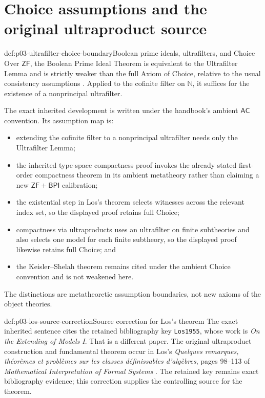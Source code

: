 \section*{Choice assumptions and the original ultraproduct source}

\begin{proofboundary}{def:p03-ultrafilter-choice-boundary}{Boolean prime ideals, ultrafilters, and Choice}
Over \(\mathsf{ZF}\), the Boolean Prime Ideal Theorem is equivalent to the
Ultrafilter Lemma and is strictly weaker than the full Axiom of Choice, relative
to the usual consistency assumptions \cite{HowardRubin1998}.  Applied to the
cofinite filter on \(\mathbb N\), it suffices for the existence of a
nonprincipal ultrafilter.

The exact inherited development is written under the handbook's ambient
\(\mathsf{AC}\) convention.  Its assumption map is:
\begin{itemize}
  \item extending the cofinite filter to a nonprincipal ultrafilter needs only
        the Ultrafilter Lemma;
  \item the inherited type-space compactness proof invokes the already stated
        first-order compactness theorem in its ambient metatheory rather than
        claiming a new \(\mathsf{ZF}+\mathsf{BPI}\) calibration;
  \item the existential step in Los's theorem selects witnesses across the
        relevant index set, so the displayed proof retains full Choice;
  \item compactness via ultraproducts uses an ultrafilter on finite subtheories
        and also selects one model for each finite subtheory, so the displayed
        proof likewise retains full Choice; and
  \item the Keisler--Shelah theorem remains cited under the ambient Choice
        convention and is not weakened here.
\end{itemize}
The distinctions are metatheoretic assumption boundaries, not new axioms of
the object theories.
\end{proofboundary}

\begin{proofboundary}{def:p03-los-source-correction}{Source correction for Los's theorem}
The exact inherited sentence cites the retained bibliography key
\texttt{Los1955}, whose work is \emph{On the Extending of Models I}.  That is a
different paper.  The original ultraproduct construction and fundamental
theorem occur in Los's \emph{Quelques remarques, th\'eor\`emes et probl\`emes
sur les classes d\'efinissables d'alg\`ebres}, pages 98--113 of
\emph{Mathematical Interpretation of Formal Systems}
\cite{Los1955Ultraproducts}.  The retained key remains exact bibliography
evidence; this correction supplies the controlling source for the theorem.
\end{proofboundary}
